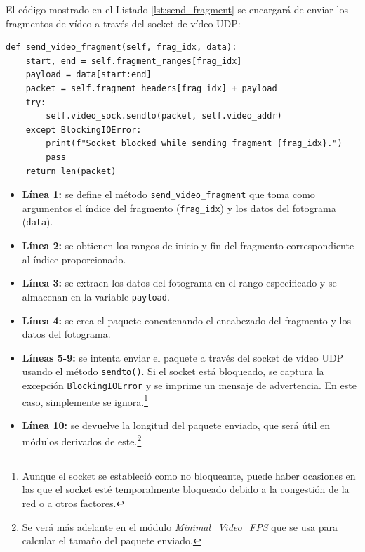 El código mostrado en el Listado \ref{lst:send_fragment} se encargará de enviar los fragmentos de vídeo a través del socket de vídeo UDP:
\begin{lstlisting}[style=pythonstyle, caption={Método \texttt{send\_video\_fragment()} de \textit{Minimal\_Video}.}, label={lst:send_fragment}]
def send_video_fragment(self, frag_idx, data):
    start, end = self.fragment_ranges[frag_idx]
    payload = data[start:end]
    packet = self.fragment_headers[frag_idx] + payload
    try:
        self.video_sock.sendto(packet, self.video_addr)
    except BlockingIOError:
        print(f"Socket blocked while sending fragment {frag_idx}.")
        pass
    return len(packet)
\end{lstlisting}

\begin{itemize}
    \item \textbf{Línea 1:} se define el método \texttt{send\_video\_fragment} que toma como argumentos el índice del fragmento (\texttt{frag\_idx}) y los datos del fotograma (\texttt{data}).
    \item \textbf{Línea 2:} se obtienen los rangos de inicio y fin del fragmento correspondiente al índice proporcionado.
    \item \textbf{Línea 3:} se extraen los datos del fotograma en el rango especificado y se almacenan en la variable \texttt{payload}.
    \item \textbf{Línea 4:} se crea el paquete concatenando el encabezado del fragmento y los datos del fotograma.
    \item \textbf{Líneas 5-9:} se intenta enviar el paquete a través del socket de vídeo UDP usando el método \texttt{sendto()}. Si el socket está bloqueado, se captura la excepción \texttt{BlockingIOError} y se imprime un mensaje de advertencia. En este caso, simplemente se ignora.\footnote{Aunque el socket se estableció como no bloqueante, puede haber ocasiones en las que el socket esté temporalmente bloqueado debido a la congestión de la red o a otros factores.}
    \item \textbf{Línea 10:} se devuelve la longitud del paquete enviado, que será útil en módulos derivados de este.\footnote{Se verá más adelante en el módulo \textit{Minimal\_Video\_FPS} que se usa para calcular el tamaño del paquete enviado.}
\end{itemize}
\vspace{\baselineskip}

